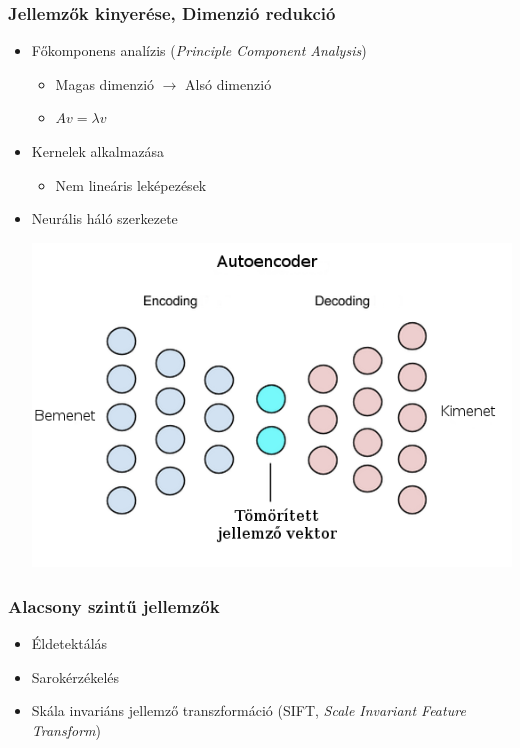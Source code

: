 \documentclass{beamer}
\begin{document}
\begin{frame}[fragile]
\frametitle{Jellemzők kinyerése, Dimenzió redukció}

\begin{itemize}
\item Főkomponens analízis (\textit{Principle Component Analysis})
	\begin{itemize}
		\item Magas dimenzió $\rightarrow$ Alsó dimenzió
		\item \(Av = \lambda v\)
	\end{itemize}
\item Kernelek alkalmazása
	\begin{itemize}
		\item Nem lineáris leképezések
	\end{itemize}
\item Neurális háló szerkezete\\
	\begin{center}
		\includegraphics[scale=0.3]{deep_autoencoder}
	\end{center}
\end{itemize}

\end{frame}

\begin{frame}[fragile]
\frametitle{Alacsony szintű jellemzők}

\begin{itemize}
\item Éldetektálás
\item Sarokérzékelés
\item Skála invariáns jellemző transzformáció (SIFT, \textit{Scale Invariant Feature Transform})
\end{itemize}

\end{frame}
\end{document}
